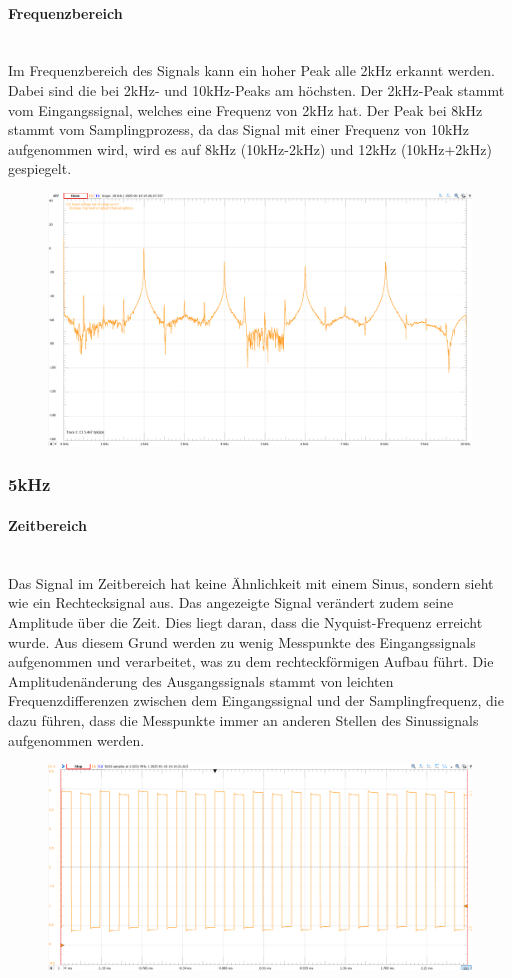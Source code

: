 \documentclass{article}
\begin{document}
\paragraph{Frequenzbereich}\mbox{}\\
Im Frequenzbereich des Signals kann ein hoher Peak alle 2kHz erkannt werden. Dabei sind die bei 2kHz- und 10kHz-Peaks am höchsten. Der 2kHz-Peak stammt vom Eingangssignal, welches eine Frequenz von 2kHz hat. Der Peak bei 8kHz stammt vom Samplingprozess, da das Signal mit einer Frequenz von 10kHz aufgenommen wird, wird es auf 8kHz (10kHz-2kHz) und 12kHz (10kHz+2kHz) gespiegelt.
\begin{figure}[h]
    \centering
    \includegraphics[width=0.75\linewidth]{img/Freq_04.png}
\end{figure}

\newpage
\subsubsection{5kHz}
\paragraph{Zeitbereich}\mbox{}\\
Das Signal im Zeitbereich hat keine Ähnlichkeit mit einem Sinus, sondern sieht wie ein Rechtecksignal aus. Das angezeigte Signal verändert zudem seine Amplitude über die Zeit. Dies liegt daran, dass die Nyquist-Frequenz erreicht wurde. Aus diesem Grund werden zu wenig Messpunkte des Eingangssignals aufgenommen und verarbeitet, was zu dem rechteckförmigen Aufbau führt. Die Amplitudenänderung des Ausgangssignals stammt von leichten Frequenzdifferenzen zwischen dem Eingangssignal und der Samplingfrequenz, die dazu führen, dass die Messpunkte immer an anderen Stellen des Sinussignals aufgenommen werden.
\begin{figure}[h]
    \centering
    \includegraphics[width=0.8\linewidth]{img/Signal_05.png}
\end{figure}
\end{document}
